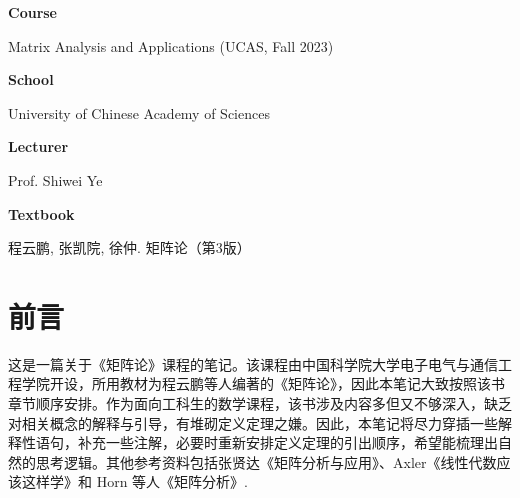 \textbf{Course}

Matrix Analysis and Applications (UCAS, Fall 2023)

\vspace{2ex}

\textbf{School}

University of Chinese Academy of Sciences

\vspace{2ex}

\textbf{Lecturer}

Prof. Shiwei Ye

\vspace{2ex}

\textbf{Textbook}

程云鹏, 张凯院, 徐仲. 矩阵论（第3版）

\newpage
\section*{前言}

这是一篇关于《矩阵论》课程的笔记。该课程由中国科学院大学电子电气与通信工程学院开设，所用教材为程云鹏等人编著的《矩阵论》\cite{cheng2006matrix}，因此本笔记大致按照该书章节顺序安排。作为面向工科生的数学课程，该书涉及内容多但又不够深入，缺乏对相关概念的解释与引导，有堆砌定义定理之嫌。因此，本笔记将尽力穿插一些解释性语句，补充一些注解，必要时重新安排定义定理的引出顺序，希望能梳理出自然的思考逻辑。其他参考资料包括张贤达《矩阵分析与应用》\cite{zhang2004matrix}、Axler《线性代数应该这样学》\cite{axler2015linear}和 Horn 等人《矩阵分析》\cite{horn2012matrix}.
